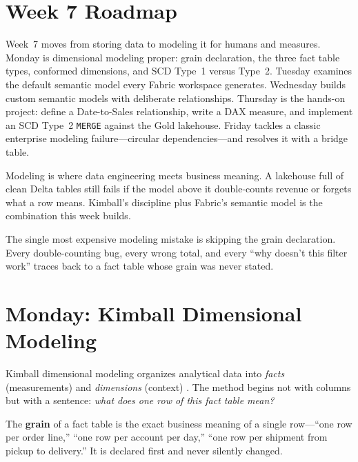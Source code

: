 \section{Week 7 Roadmap}
Week~7 moves from storing data to modeling it for humans and measures. Monday is dimensional modeling proper: grain declaration, the three fact table types, conformed dimensions, and SCD Type~1 versus Type~2. Tuesday examines the default semantic model every Fabric workspace generates. Wednesday builds custom semantic models with deliberate relationships. Thursday is the hands-on project: define a Date-to-Sales relationship, write a DAX measure, and implement an SCD Type~2 \texttt{MERGE} against the Gold lakehouse. Friday tackles a classic enterprise modeling failure---circular dependencies---and resolves it with a bridge table.

Modeling is where data engineering meets business meaning. A lakehouse full of clean Delta tables still fails if the model above it double-counts revenue or forgets what a row means. Kimball's discipline \cite{kimballToolkit} plus Fabric's semantic model \cite{microsoftFabricSemanticModels} is the combination this week builds.

\begin{notebox}
The single most expensive modeling mistake is skipping the grain declaration. Every double-counting bug, every wrong total, and every ``why doesn't this filter work'' traces back to a fact table whose grain was never stated.
\end{notebox}

\section{Monday: Kimball Dimensional Modeling}
Kimball dimensional modeling organizes analytical data into \emph{facts} (measurements) and \emph{dimensions} (context) \cite{kimballToolkit}. The method begins not with columns but with a sentence: \emph{what does one row of this fact table mean?}

\begin{definitionbox}
The \textbf{grain} of a fact table is the exact business meaning of a single row---``one row per order line,'' ``one row per account per day,'' ``one row per shipment from pickup to delivery.'' It is declared first and never silently changed.
\end{definitionbox}

